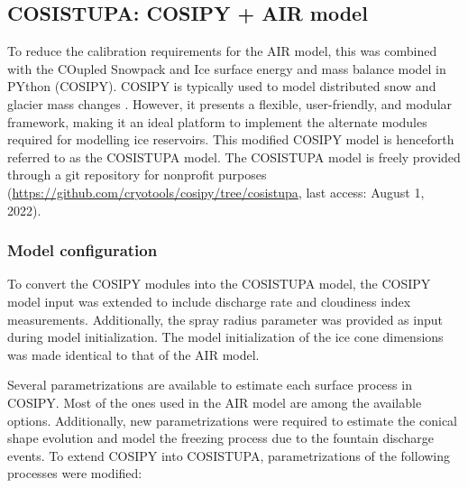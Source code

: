 \subsection{COSISTUPA: COSIPY + AIR model}
\label{sec:Cosistupa}

To reduce the calibration requirements for the \ac{AIR} model, this was combined with the COupled
Snowpack and Ice surface energy and mass balance model in PYthon (COSIPY). COSIPY is typically used to
model distributed snow and glacier mass changes \citep{sauterCOSIPYV1Opensource2020}. However, it presents a
flexible, user-friendly, and modular framework, making it an ideal platform to implement the alternate
modules required for modelling ice reservoirs. This modified COSIPY model is henceforth referred to as the COSISTUPA model. The COSISTUPA model is freely provided through a git repository for nonprofit purposes
(\url{https://github.com/cryotools/cosipy/tree/cosistupa}, last access: August 1, 2022). 


\subsubsection{Model configuration}

To convert the COSIPY modules into the COSISTUPA model, the COSIPY model input was extended to include discharge rate and cloudiness index measurements. Additionally, the spray radius parameter was provided as input during model initialization. The model initialization of the ice
cone dimensions was made identical to that of the \ac{AIR} model.

Several parametrizations are available to estimate each surface process in COSIPY. Most of the ones
used in the \ac{AIR} model are among the available options. Additionally, new parametrizations were required to
estimate the conical shape evolution and model the freezing process due to the fountain discharge events. To
extend COSIPY into COSISTUPA, parametrizations of the following processes were modified:

